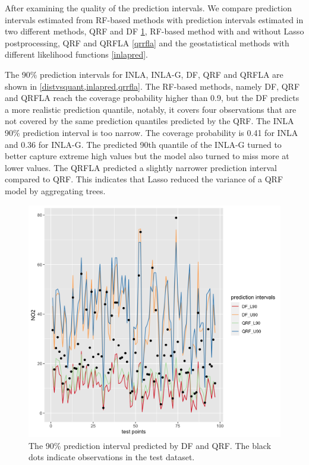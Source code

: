 \documentclass{article}
\begin{document}
After examining the quality of the prediction intervals. We compare prediction intervals estimated from RF-based methods with prediction intervals estimated in two different methods, QRF and DF \cref{distvsquant}, RF-based method with and without Lasso postprocessing, QRF and QRFLA \cref{qrrfla} and the geostatistical methods with different likelihood functions \cref{inlapred}. 
 
The 90\% prediction intervals for INLA, INLA-G, DF, QRF and QRFLA are shown in \cref{distvsquant,inlapred,qrrfla}. The RF-based methods, namely DF, QRF and QRFLA reach the coverage probability higher than 0.9, but the DF predicts a more realistic prediction quantile, notably, it covers four observations that are not covered by the same prediction quantiles predicted by the QRF. The INLA 90\% prediction interval is too narrow. The coverage probability is 0.41 for INLA and 0.36 for INLA-G. The predicted 90th quantile of the INLA-G turned to better capture extreme high values but the model also turned to miss more at lower values. The QRFLA predicted a slightly narrower prediction interval compared to QRF. This indicates that Lasso reduced the variance of a QRF model by aggregating trees.  

\label{sec:predinterval}
\begin{figure}
\centering
\includegraphics[scale = 0.2]{fig/qrf_df.png}
\caption{The 90\% prediction interval predicted by DF and QRF. The black dots indicate observations in the test dataset.}
\label{distvsquant}
\end{figure}
\end{document}
